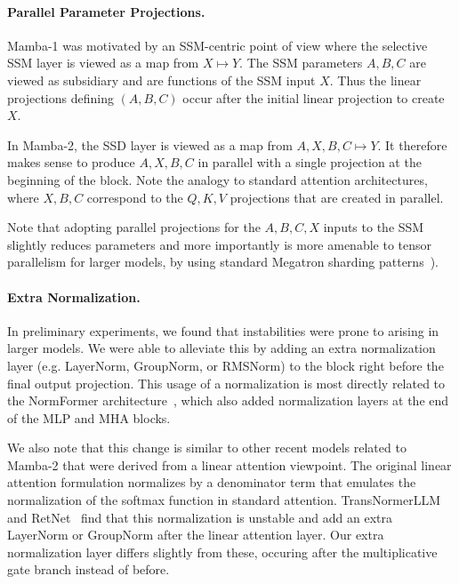 \paragraph{Parallel Parameter Projections.}

Mamba-1 was motivated by an SSM-centric point of view
where the selective SSM layer is viewed as a map from $X \mapsto Y$.
The SSM parameters $A, B, C$ are viewed as
subsidiary and are functions of the SSM input $X$.
Thus the linear projections defining $(A, B, C)$ occur after the initial linear projection to create $X$.

In Mamba-2, the SSD layer is viewed as a map from $A, X, B, C \mapsto Y$.
It therefore makes sense to produce $A, X, B, C$ in parallel with a single projection at the beginning of the block.
Note the analogy to standard attention architectures,
where $X, B, C$ correspond to the $Q, K, V$ projections that are created in parallel.

Note that adopting parallel projections for the $A, B, C, X$ inputs to the SSM slightly reduces parameters and more importantly is more amenable to tensor parallelism for larger models, by using standard Megatron sharding patterns~\citep{shoeybi2019megatron}).


\paragraph{Extra Normalization.}

In preliminary experiments, we found that instabilities were prone to arising in larger models.
We were able to alleviate this by adding an extra normalization layer (e.g. LayerNorm, GroupNorm, or RMSNorm) to the block right before the final output projection.
This usage of a normalization is most directly related to the NormFormer architecture~\citep{shleifer2021normformer}, which also added normalization layers at the end of the MLP and MHA blocks.

We also note that this change is similar to other recent models related to Mamba-2 that were derived from a linear attention viewpoint.
The original linear attention formulation normalizes by a denominator term that emulates the normalization of the softmax function in standard attention.
TransNormerLLM~\citep{qin2023transnormerllm} and RetNet~\citep{sun2023retentive} find that this normalization is unstable and add an extra LayerNorm or GroupNorm after the linear attention layer.
Our extra normalization layer differs slightly from these, occuring after the multiplicative gate branch instead of before.


